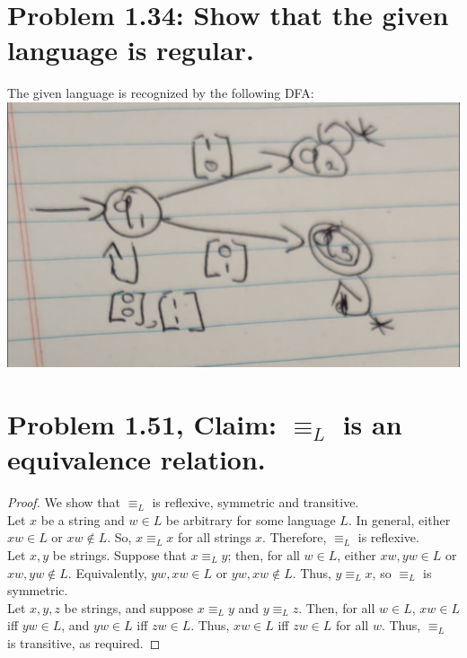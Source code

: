 \documentclass[12pt]{article}
\begin{document}
\section*{Problem 1.34: Show that the given language is regular.}
The given language is recognized by the following DFA: \\
\newline
\includegraphics[width=0.5\linewidth]{problem134.jpg}

\section*{Problem 1.51, Claim: $\equiv_{L}$ is an equivalence relation.}
\begin{proof}
	We show that $\equiv_{L}$ is reflexive, symmetric and transitive. \\
	\newline
	Let $x$ be a string and $w \in L$ be arbitrary for some language $L$. In general, either $xw \in L$ or $xw \notin L$. So, $x \equiv_{L} x$ for all strings $x$. Therefore, $\equiv_{L}$ is reflexive. \\
	\newline
	Let $x, y$ be strings. Suppose that $x \equiv_{L} y$; then, for all $w \in L$, either $xw, yw \in L$ or $xw, yw \notin L$. Equivalently, $yw, xw \in L$ or $yw, xw \notin L$. Thus, $y \equiv_{L} x$, so $\equiv_{L}$ is symmetric. \\
	\newline
	Let $x, y, z$ be strings, and suppose $x \equiv_{L} y$ and $y \equiv_{L} z$. Then, for all $w \in L$, $xw \in L$ iff $yw \in L$, and $yw \in L$ iff $zw \in L$. Thus, $xw \in L$ iff $zw \in L$ for all $w$. Thus, $\equiv_{L}$ is transitive, as required.
\end{proof}
\end{document}
